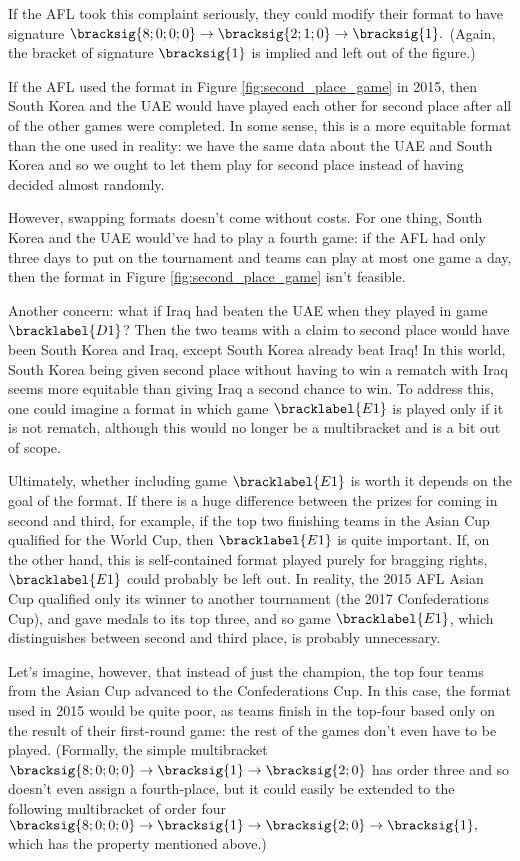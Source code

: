 {    If the AFL took this complaint seriously, they could modify their format to have signature $\bracksig{8;0;0;0} \to \bracksig{2; 1; 0} \to \bracksig{1}.$ (Again, the bracket of signature $\bracksig{1}$ is implied and left out of the figure.)
    

    If the AFL used the format in Figure \ref{fig:second_place_game} in 2015, then South Korea and the UAE would have played each other for second place after all of the other games were completed. In some sense, this is a more equitable format than the one used in reality: we have the same data about the UAE and South Korea and so we ought to let them play for second place instead of having decided almost randomly.

    However, swapping formats doesn't come without costs. For one thing, South Korea and the UAE would've had to play a fourth game: if the AFL had only three days to put on the tournament and teams can play at most one game a day, then the format in Figure \ref{fig:second_place_game} isn't feasible.

    Another concern: what if Iraq had beaten the UAE when they played in game $\bracklabel{D1}$? Then the two teams with a claim to second place would have been South Korea and Iraq, except South Korea already beat Iraq! In this world, South Korea being given second place without having to win a rematch with Iraq seems more equitable than giving Iraq a second chance to win. To address this, one could imagine a format in which game $\bracklabel{E1}$ is played only if it is not rematch, although this would no longer be a multibracket and is a bit out of scope.

    Ultimately, whether including game $\bracklabel{E1}$ is worth it depends on the goal of the format. If there is a huge difference between the prizes for coming in second and third, for example, if the top two finishing teams in the Asian Cup qualified for the World Cup, then $\bracklabel{E1}$ is quite important. If, on the other hand, this is self-contained format played purely for bragging rights, $\bracklabel{E1}$ could probably be left out. In reality, the 2015 AFL Asian Cup qualified only its winner to another tournament (the 2017 Confederations Cup), and gave medals to its top three, and so game $\bracklabel{E1}$, which distinguishes between second and third place, is probably unnecessary.

    Let's imagine, however, that instead of just the champion, the top four teams from the Asian Cup advanced to the Confederations Cup. In this case, the format used in 2015 would be quite poor, as teams finish in the top-four based only on the result of their first-round game: the rest of the games don't even have to be played. (Formally, the simple multibracket $\bracksig{8;0;0;0} \to \bracksig{1} \to \bracksig{2; 0}$ has order three and so doesn't even assign a fourth-place, but it could easily be extended to the following multibracket of order four $\bracksig{8;0;0;0} \to \bracksig{1} \to \bracksig{2; 0} \to \bracksig{1},$ which has the property mentioned above.)
    
}
